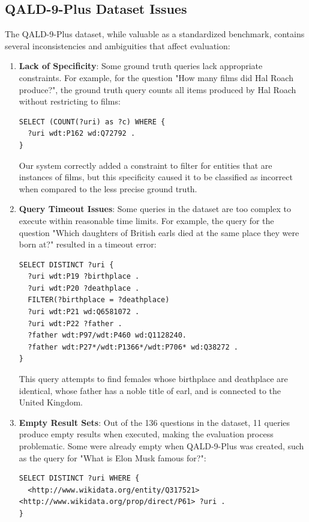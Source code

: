 \subsection{QALD-9-Plus Dataset Issues}
The QALD-9-Plus dataset, while valuable as a standardized benchmark, contains several inconsistencies and ambiguities that affect evaluation:
\begin{enumerate}
\item \textbf{Lack of Specificity}: Some ground truth queries lack appropriate constraints. For example, for the question "How many films did Hal Roach produce?", the ground truth query counts all items produced by Hal Roach without restricting to films:

\begin{lstlisting}[language=SPARQL]
SELECT (COUNT(?uri) as ?c) WHERE { 
  ?uri wdt:P162 wd:Q72792 . 
}
\end{lstlisting}

Our system correctly added a constraint to filter for entities that are instances of films, but this specificity caused it to be classified as incorrect when compared to the less precise ground truth.

\item \textbf{Query Timeout Issues}: Some queries in the dataset are too complex to execute within reasonable time limits. For example, the query for the question "Which daughters of British earls died at the same place they were born at?" resulted in a timeout error:

\begin{lstlisting}[language=SPARQL]
SELECT DISTINCT ?uri { 
  ?uri wdt:P19 ?birthplace . 
  ?uri wdt:P20 ?deathplace . 
  FILTER(?birthplace = ?deathplace) 
  ?uri wdt:P21 wd:Q6581072 . 
  ?uri wdt:P22 ?father . 
  ?father wdt:P97/wdt:P460 wd:Q1128240. 
  ?father wdt:P27*/wdt:P1366*/wdt:P706* wd:Q38272 . 
}
\end{lstlisting}
This query attempts to find females whose birthplace and deathplace are identical, whose father has a noble title of earl, and is connected to the United Kingdom.

\item \textbf{Empty Result Sets}: Out of the 136 questions in the dataset, 11 queries produce empty results when executed, making the evaluation process problematic. Some were already empty when QALD-9-Plus was created, such as the query for "What is Elon Musk famous for?":

\begin{lstlisting}[language=SPARQL]
SELECT DISTINCT ?uri WHERE { 
  <http://www.wikidata.org/entity/Q317521> <http://www.wikidata.org/prop/direct/P61> ?uri . 
}
\end{lstlisting}


\end{enumerate}

